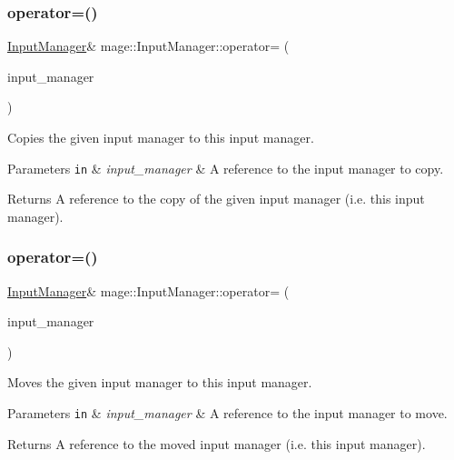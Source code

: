 \subsubsection{\texorpdfstring{operator=()}{operator=()}\hspace{0.1cm}{\footnotesize\ttfamily [1/2]}}
{\footnotesize\ttfamily \hyperlink{classmage_1_1_input_manager}{Input\+Manager}\& mage\+::\+Input\+Manager\+::operator= (\begin{DoxyParamCaption}\item[{const \hyperlink{classmage_1_1_input_manager}{Input\+Manager} \&}]{input\+\_\+manager }\end{DoxyParamCaption})\hspace{0.3cm}{\ttfamily [delete]}}

Copies the given input manager to this input manager.


\begin{DoxyParams}[1]{Parameters}
\mbox{\tt in}  & {\em input\+\_\+manager} & A reference to the input manager to copy. \\
\hline
\end{DoxyParams}
\begin{DoxyReturn}{Returns}
A reference to the copy of the given input manager (i.\+e. this input manager). 
\end{DoxyReturn}
\hypertarget{classmage_1_1_input_manager_ae7c1c4d2d55d86cbc88a5fbc2f1279a8}{}\label{classmage_1_1_input_manager_ae7c1c4d2d55d86cbc88a5fbc2f1279a8} 
\subsubsection{\texorpdfstring{operator=()}{operator=()}\hspace{0.1cm}{\footnotesize\ttfamily [2/2]}}
{\footnotesize\ttfamily \hyperlink{classmage_1_1_input_manager}{Input\+Manager}\& mage\+::\+Input\+Manager\+::operator= (\begin{DoxyParamCaption}\item[{\hyperlink{classmage_1_1_input_manager}{Input\+Manager} \&\&}]{input\+\_\+manager }\end{DoxyParamCaption})\hspace{0.3cm}{\ttfamily [delete]}}

Moves the given input manager to this input manager.


\begin{DoxyParams}[1]{Parameters}
\mbox{\tt in}  & {\em input\+\_\+manager} & A reference to the input manager to move. \\
\hline
\end{DoxyParams}
\begin{DoxyReturn}{Returns}
A reference to the moved input manager (i.\+e. this input manager). 
\end{DoxyReturn}
\hypertarget{classmage_1_1_input_manager_a5e516969ff4ae9876b98c28f48f93726}{}\label{classmage_1_1_input_manager_a5e516969ff4ae9876b98c28f48f93726} 
